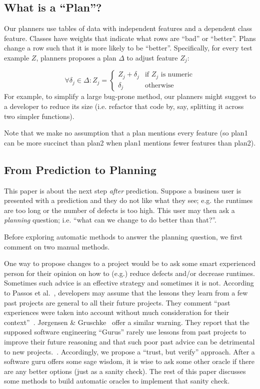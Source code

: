 \documentclass{sig-alternate}
\begin{document}
\subsection{What is a ``Plan''?}

Our planners   use tables of data with independent features and a dependent class
feature. Classes have weights  that  indicate  what rows are ``bad'' or ``better''. Plans  change   a row such that it is more likely to be ``better''. 
Specifically, for every test example $Z$,   planners proposes a  plan $\Delta$ to
  adjust   feature $Z_j$:

{\small\[
\forall \delta_j \in \Delta :  Z_j =  
\begin{cases}
     Z_j + \delta_j& \text{if $Z_j$ is numeric}\\
    \delta_j              & \text{otherwise}
\end{cases}
\]}
For example, to simplify a  large bug-prone  method, our planners might suggest
to a developer to reduce its size (i.e.  refactor that code by, say, splitting it across
two simpler functions).

Note that we make no assumption that a plan mentions every feature
(so plan1 can be  more succinct than plan2 when plan1  mentions fewer features than
plan2).


\subsection{From Prediction to Planning}\label{sect:p2p}
 
 
This paper is about the next step {\em after} prediction. Suppose
a business user is presented with  a prediction and they do not like what they see; e.g. the runtimes are too long or the number of defects is too high. This user may
then ask a {\em planning}  question; i.e. ``what can we change to do better than that?''.

 

Before exploring automatic methods to answer the planning question, we first comment
on two manual methods.

One way to propose changes to a project would be to   ask some smart experienced
person for their opinion on how to (e.g.) reduce defects and/or decrease runtimes. Sometimes
such advice 
is an effective strategy and sometimes it is not.
According to Passos et al.~\cite{passos11},  developers
may  assume that the lessons they learn from a few past
projects are general to 
all their future projects. They comment ``past experiences were taken into account without 
much consideration for their context''~\cite{passos11}.  
 J{\o}rgensen \& Gruschke~\cite{jorgensen09} offer  a similar warning. They report that the 
  supposed software engineering  ``Gurus'' rarely use lessons
  from past projects to improve their future reasoning and that such poor
  past advice can be detrimental to new projects.~\cite{jorgensen09}.
  Accordingly, we   propose a ``trust, but verify'' approach.
  After a software guru offers some sage wisdom,  it is wise to ask some other oracle 
  if there are any better options
  (just as a sanity check).
  The rest of this paper discusses some methods to build automatic oracles 
  to implement that   sanity check.
  
\end{document}
